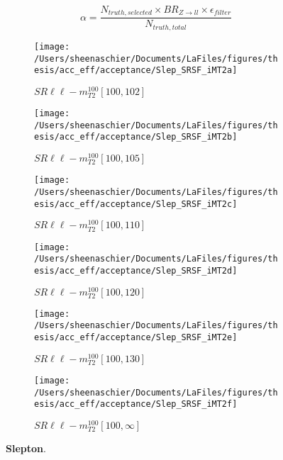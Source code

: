   \begin{equation}
  \alpha = \frac{N_{truth,selected}\times{BR_{Z\rightarrow ll}}\times{\epsilon_{filter}}}{N_{truth,total}}
 \label{eq:acceptance}
  \end{equation}
\begin{figure}
        \centering
    \begin{subfigure}[b]{0.49\textwidth}
        \texttt{[image: /Users/sheenaschier/Documents/LaFiles/figures/thesis/acc\_eff/acceptance/Slep\_SRSF\_iMT2a]}
    \caption{$SR\ell\ell-m^{100}_{T2}[100,102]$}
    \end{subfigure}
    \begin{subfigure}[b]{0.49\textwidth}
        \texttt{[image: /Users/sheenaschier/Documents/LaFiles/figures/thesis/acc\_eff/acceptance/Slep\_SRSF\_iMT2b]}
    \caption{$SR\ell\ell-m^{100}_{T2}[100,105]$}
    \end{subfigure}
    \begin{subfigure}[b]{0.49\textwidth}
        \texttt{[image: /Users/sheenaschier/Documents/LaFiles/figures/thesis/acc\_eff/acceptance/Slep\_SRSF\_iMT2c]}
    \caption{$SR\ell\ell-m^{100}_{T2}[100,110]$}
    \end{subfigure}
    \begin{subfigure}[b]{0.49\textwidth}
        \texttt{[image: /Users/sheenaschier/Documents/LaFiles/figures/thesis/acc\_eff/acceptance/Slep\_SRSF\_iMT2d]}
    \caption{$SR\ell\ell-m^{100}_{T2}[100,120]$}
    \end{subfigure}
    \begin{subfigure}[b]{0.49\textwidth}
        \texttt{[image: /Users/sheenaschier/Documents/LaFiles/figures/thesis/acc\_eff/acceptance/Slep\_SRSF\_iMT2e]}
    \caption{$SR\ell\ell-m^{100}_{T2}[100,130]$}
    \end{subfigure}
    \begin{subfigure}[b]{0.49\textwidth}
        \texttt{[image: /Users/sheenaschier/Documents/LaFiles/figures/thesis/acc\_eff/acceptance/Slep\_SRSF\_iMT2f]}
    \caption{$SR\ell\ell-m^{100}_{T2}[100,\infty]$}
    \end{subfigure}
    \caption{\label{fig:slepton_truth_acceptance}\textbf{Slepton}.}
\end{figure}


